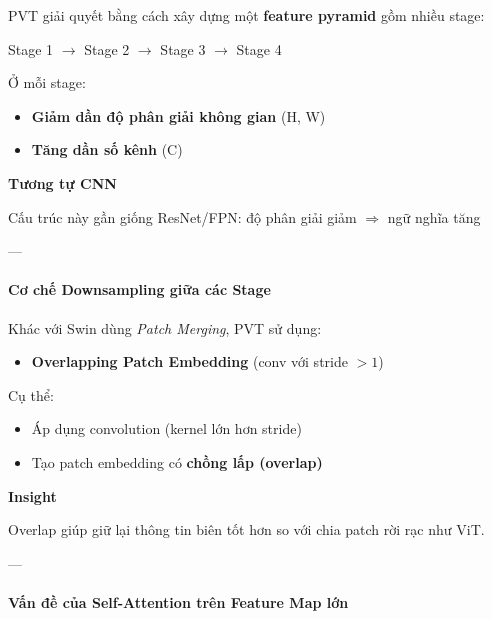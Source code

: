 PVT giải quyết bằng cách xây dựng một \textbf{feature pyramid} gồm nhiều stage:

\begin{center}
	Stage 1 $\rightarrow$ Stage 2 $\rightarrow$ Stage 3 $\rightarrow$ Stage 4
\end{center}

Ở mỗi stage:
\begin{itemize}
	\item \textbf{Giảm dần độ phân giải không gian} (H, W)
	\item \textbf{Tăng dần số kênh} (C)
\end{itemize}

\begin{mdframed}[style=infobox]
	\textbf{Tương tự CNN}
	
	Cấu trúc này gần giống ResNet/FPN:  
	độ phân giải giảm $\Rightarrow$ ngữ nghĩa tăng
\end{mdframed}

---

\paragraph{Cơ chế Downsampling giữa các Stage}

Khác với Swin dùng \textit{Patch Merging}, PVT sử dụng:

\begin{itemize}
	\item \textbf{Overlapping Patch Embedding} (conv với stride $>1$)
\end{itemize}

Cụ thể:
\begin{itemize}
	\item Áp dụng convolution (kernel lớn hơn stride)
	\item Tạo patch embedding có \textbf{chồng lấp (overlap)}
\end{itemize}

\begin{mdframed}[style=infobox]
	\textbf{Insight}
	
	Overlap giúp giữ lại thông tin biên tốt hơn so với chia patch rời rạc như ViT.
\end{mdframed}

---

\paragraph{Vấn đề của Self-Attention trên Feature Map lớn}

